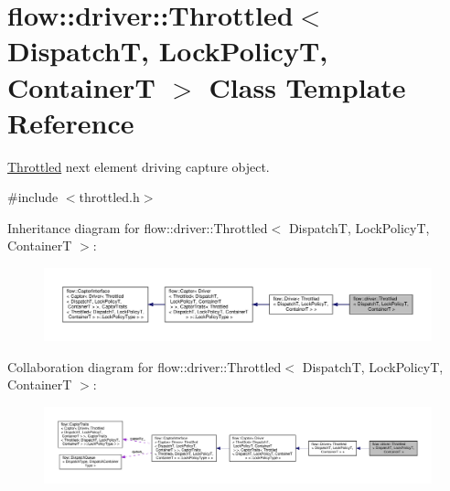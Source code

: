 \hypertarget{classflow_1_1driver_1_1_throttled}{}\section{flow\+:\+:driver\+:\+:Throttled$<$ DispatchT, Lock\+PolicyT, ContainerT $>$ Class Template Reference}
\label{classflow_1_1driver_1_1_throttled}


\hyperlink{classflow_1_1driver_1_1_throttled}{Throttled} next element driving capture object.  




{\ttfamily \#include $<$throttled.\+h$>$}



Inheritance diagram for flow\+:\+:driver\+:\+:Throttled$<$ DispatchT, Lock\+PolicyT, ContainerT $>$\+:\nopagebreak
\begin{figure}[H]
\begin{center}
\leavevmode
\includegraphics[width=350pt]{classflow_1_1driver_1_1_throttled__inherit__graph}
\end{center}
\end{figure}


Collaboration diagram for flow\+:\+:driver\+:\+:Throttled$<$ DispatchT, Lock\+PolicyT, ContainerT $>$\+:\nopagebreak
\begin{figure}[H]
\begin{center}
\leavevmode
\includegraphics[width=350pt]{classflow_1_1driver_1_1_throttled__coll__graph}
\end{center}
\end{figure}
